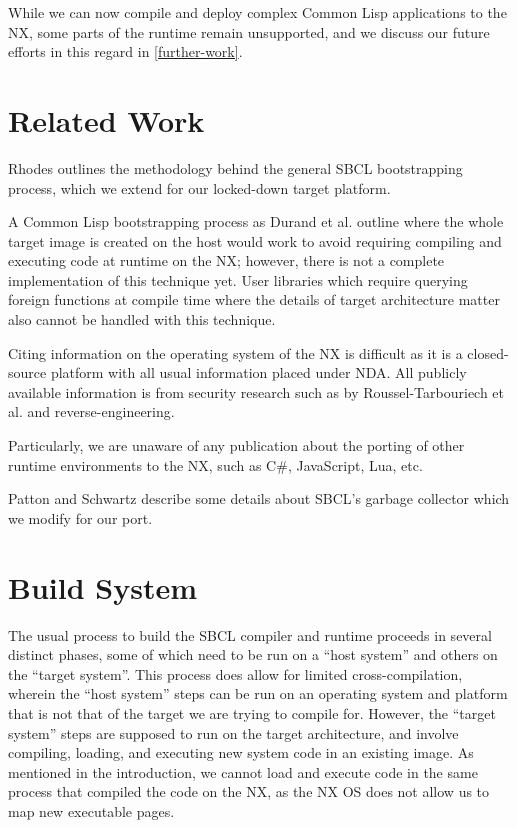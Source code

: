\documentclass[format=sigconf]{acmart}
\begin{document}
While we can now compile and deploy complex Common Lisp applications to the NX, some parts of the runtime remain unsupported, and we discuss our future efforts in this regard in \autoref{further-work}.

\section{Related Work}\label{relatedwork}
Rhodes\cite{rhodes2008sbcl} outlines the methodology behind the general SBCL bootstrapping process, which we extend for our locked-down target platform.

A Common Lisp bootstrapping process as Durand et al.\cite{durand2019bootstrapping} outline where the whole target image is created on the host would work to avoid requiring compiling and executing code at runtime on the NX; however, there is not a complete implementation of this technique yet. User libraries which require querying foreign functions at compile time where the details of target architecture matter also cannot be handled with this technique.

Citing information on the operating system of the NX is difficult as it is a closed-source platform with all usual information placed under NDA. All publicly available information is from security research such as by Roussel-Tarbouriech et al.\cite{roussel2019methodically} and reverse-engineering\cite{switchbrew}.

Particularly, we are unaware of any publication about the porting of other runtime environments to the NX, such as C\#, JavaScript, Lua, etc.

Patton\cite{patton2023parallel} and Schwartz\cite{schwartz2018dynamic} describe some details about SBCL's garbage collector which we modify for our port.

\section{Build System}\label{build}
The usual process to build the SBCL compiler and runtime proceeds in several distinct phases, some of which need to be run on a ``host system'' and others on the ``target system''. This process does allow for limited cross-compilation, wherein the ``host system'' steps can be run on an operating system and platform that is not that of the target we are trying to compile for. However, the ``target system'' steps are supposed to run on the target architecture, and involve compiling, loading, and executing new system code in an existing image. As mentioned in the introduction, we cannot load and execute code in the same process that compiled the code on the NX, as the NX OS does not allow us to map new executable pages.
\end{document}
